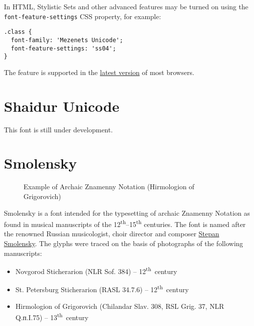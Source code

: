 \documentclass[11pt]{article}
\begin{document}
In HTML, Stylistic Sets and other advanced features may be turned on using the
\verb+font-feature-settings+ CSS property, for example:

\begin{verbatim}
.class {
  font-family: 'Mezenets Unicode';
  font-feature-settings: 'ss04';
}
\end{verbatim}

The feature is supported in the 
\href{https://caniuse.com/#search=font-feature-settings}{latest version} of most browsers.

\section{Shaidur Unicode}

This font is still under development.

\section{Smolensky}

\begin{figure}[tb]
\centering
\begin{minipage}{0.75\textwidth}
\begin{churchslavonic}
\archaic
\noindent
\Large
{}
\end{churchslavonic}
\end{minipage}
\caption{Example of Archaic Znamenny Notation (Hirmologion of Grigorovich) \label{smolensky}}
\end{figure}

Smolensky is a font intended for the typesetting of archaic Znamenny Notation
as found in musical manuscripts of the 12\textsuperscript{th}--15\textsuperscript{th}
centuries. The font is named after the renowned Russian musicologist,
choir director and composer
\href{https://en.wikipedia.org/wiki/Stepan_Smolensky}{Stepan Smolensky}.
The glyphs were traced on the basis of photographs of the following manuscripts:

\begin{itemize}
\item Novgorod Sticherarion (NLR Sof. 384) -- 12\textsuperscript{th}~century
\item St. Petersburg Sticherarion (RASL 34.7.6) -- 12\textsuperscript{th}~century
\item Hirmologion of Grigorovich (Chilandar Slav. 308, RSL Grig. 37, NLR Q.п.I.75) -- 13\textsuperscript{th}~century
\end{itemize}
\end{document}
